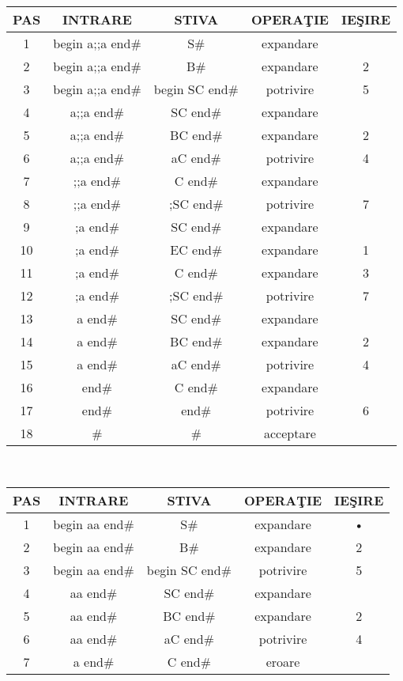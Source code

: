 \begin{tabular}{|c|c|c|c|c|}
   \hline 
   \textbf{PAS} & \textbf{INTRARE} & \textbf{STIVA} & \textbf{OPERA\c TIE} & \textbf{IE\c SIRE} \\ 
   \hline 
   1 & begin a;;a end\# & S\# & expandare &  \\ 
   \hline 
   2 & begin a;;a end\# & B\# & expandare & 2 \\ 
   \hline 
   3 & begin a;;a end\# & begin SC end\# & potrivire & 5 \\ 
   \hline 
   4 & a;;a end\# & SC end\# & expandare &  \\ 
   \hline 
   5 & a;;a end\# & BC end\# & expandare & 2 \\ 
   \hline 
   6 & a;;a end\# & aC end\# & potrivire & 4 \\ 
   \hline 
   7 & ;;a end\# & C end\# & expandare &  \\ 
   \hline 
   8 & ;;a end\# & ;SC end\# & potrivire & 7 \\ 
   \hline 
   9 & ;a end\# & SC end\# & expandare &  \\ 
   \hline 
   10 & ;a end\# & EC end\# & expandare & 1 \\ 
   \hline 
   11 & ;a end\# & C end\# & expandare & 3 \\ 
   \hline 
   12 & ;a end\# & ;SC end\# & potrivire & 7 \\ 
   \hline 
   13 & a end\# & SC end\# & expandare &  \\ 
   \hline 
   14 & a end\# & BC end\# & expandare & 2 \\ 
   \hline 
   15 & a end\# & aC end\# & potrivire & 4 \\ 
   \hline 
   16 & end\# & C end\# & expandare &  \\ 
   \hline 
   17 & end\# & end\# & potrivire & 6 \\ 
   \hline 
   18 & \# & \# & acceptare &  \\ 
   \hline 
   \end{tabular}\\
   \linebreak
   \begin{tabular}{|c|c|c|c|c|}
       \hline 
        \textbf{PAS} & \textbf{INTRARE} & \textbf{STIVA} & \textbf{OPERA\c TIE} & \textbf{IE\c SIRE} \\ 
       \hline 
       1 & begin aa end\# & S\# & expandare & • \\ 
       \hline 
       2 & begin aa end\# & B\# & expandare & 2 \\ 
       \hline 
       3 & begin aa end\# & begin SC end\# & potrivire & 5 \\ 
       \hline 
       4 & aa end\# & SC end\# & expandare &  \\ 
       \hline 
       5 & aa end\# & BC end\# & expandare & 2 \\ 
       \hline 
       6 & aa end\# & aC end\# & potrivire & 4 \\ 
       \hline 
       7 & a end\# & C end\# & eroare &  \\ 
       \hline 
       \end{tabular} \\
       
